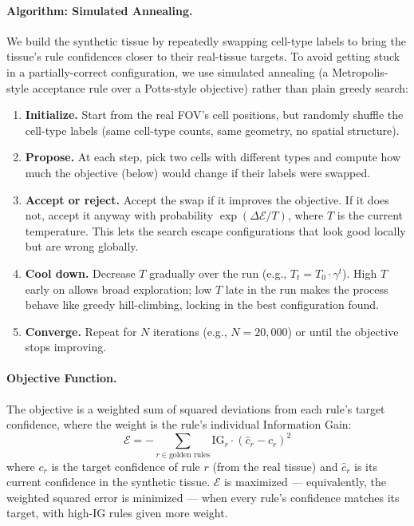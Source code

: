 \documentclass[10pt, a4paper]{article}
\begin{document}
\paragraph{Algorithm: Simulated Annealing.}
We build the synthetic tissue by repeatedly swapping cell-type labels to bring the tissue's rule confidences closer to their real-tissue targets. To avoid getting stuck in a partially-correct configuration, we use simulated annealing (a Metropolis-style acceptance rule over a Potts-style objective) rather than plain greedy search:
\begin{enumerate}
    \item \textbf{Initialize.} Start from the real FOV's cell positions, but randomly shuffle the cell-type labels (same cell-type counts, same geometry, no spatial structure).
    \item \textbf{Propose.} At each step, pick two cells with different types and compute how much the objective (below) would change if their labels were swapped.
    \item \textbf{Accept or reject.} Accept the swap if it improves the objective. If it does not, accept it anyway with probability $\exp(\Delta\mathcal{E}/T)$, where $T$ is the current temperature. This lets the search escape configurations that look good locally but are wrong globally.
    \item \textbf{Cool down.} Decrease $T$ gradually over the run (e.g., $T_t = T_0 \cdot \gamma^t$). High $T$ early on allows broad exploration; low $T$ late in the run makes the process behave like greedy hill-climbing, locking in the best configuration found.
    \item \textbf{Converge.} Repeat for $N$ iterations (e.g., $N = 20{,}000$) or until the objective stops improving.
\end{enumerate}

\paragraph{Objective Function.}
The objective is a weighted sum of squared deviations from each rule's target confidence, where the weight is the rule's individual Information Gain:
\begin{equation}
    \mathcal{E} = -\sum_{r \in \text{golden rules}} \mathrm{IG}_r \cdot \left( \hat{c}_r - c_r \right)^2
\end{equation}
where $c_r$ is the target confidence of rule $r$ (from the real tissue) and $\hat{c}_r$ is its current confidence in the synthetic tissue. $\mathcal{E}$ is maximized — equivalently, the weighted squared error is minimized — when every rule's confidence matches its target, with high-IG rules given more weight.
\end{document}
